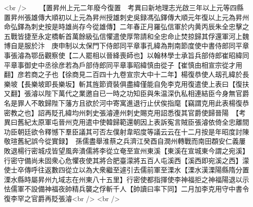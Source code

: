 <br />
　　【置昇州上元二年廢今復置　考異曰新地理志光啟三年以上元等四縣置昇州張雄傳大順初以上元為昇州授雄刺史吳録馮弘鐸傳大順元年復以上元為昇州命弘鐸為刺史按是時雄尚存今從雄傳】二年春正月羅弘信軍於内黄丙辰朱全忠擊之五戰皆捷至永定橋斬首萬餘級弘信懼遣使厚幣請和全忠命止焚掠歸其俘還軍河上魏博自是服於汴　庚申制以太保門下侍郎同平章事孔緯為荆南節度使中書侍郎同平章事張濬為鄂岳觀察使【二人罷相以晉絳喪師也】以翰林學士承旨兵部侍郎崔昭緯同平章事御史中丞徐彦若為戶部侍郎同平章事昭緯慎由從子【崔慎由相宣宗從才用翻】彦若商之子也【徐商見二百四十九卷宣宗大中十二年】楊復恭使人刼孔緯於長樂坡【長樂坡即長樂坂】斬其旌節資裝俱盡緯僅能自免李克用復遣使上表曰【復扶又翻】張濬以陛下萬代之業邀自已一時之功知臣與朱温深仇私相連結臣今身無官爵名是罪人不敢歸陛下藩方且欲於河中寄寓進退行止伏俟指麾【竊謂克用此表楊復恭密教之也】詔再貶孔緯均州刺史張濬連州刺史賜克用詔悉復其官爵使歸晉陽　【考異曰舊紀太原軍屯晉州克用遣中使韓歸範還朝因上表訴寃言賊臣張濬依倚全忠離間功臣朝廷欲令釋憾下羣臣議其可否左僕射韋昭度等議云云在十二月按是年昭度討陳敬瑄舊紀誤今從實録】　孫儒盡舉淮蔡之兵濟江癸酉自潤州轉戰而南田頵安仁義屢敗退楊行密城戍皆望風奔潰儒將李從立奄至宣州東溪【東溪在宣城東今謂之宛溪】行密守備尚未固衆心危懼夜使其將合肥臺濛將五百人屯溪西【溪西即宛溪之西】濛使士卒傳呼往返數四從立以為大衆繼至遽引去儒前軍至溧水【溧水漢溧陽縣隋分置溧水縣時屬昇州九域志在州東八十五里】行密使都指揮使李神福拒之神福陽退以示怯儒軍不設備神福夜帥精兵襲之俘斬千人【帥讀曰率下同】二月加李克用守中書令復李罕之官爵再貶張濬<br />
<br />

